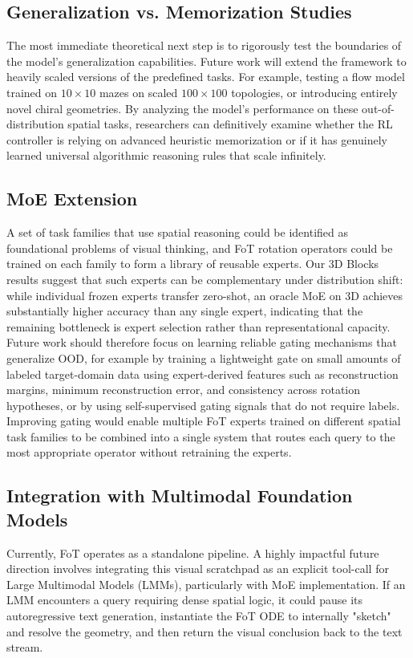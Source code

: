 \documentclass{l4proj}
\begin{document}
\subsection{Generalization vs. Memorization Studies}
The most immediate theoretical next step is to rigorously test the boundaries of the model's generalization capabilities. Future work will extend the framework to heavily scaled versions of the predefined tasks. For example, testing a flow model trained on $10 \times 10$ mazes on scaled $100 \times 100$ topologies, or introducing entirely novel chiral geometries. By analyzing the model's performance on these out-of-distribution spatial tasks, researchers can definitively examine whether the RL controller is relying on advanced heuristic memorization or if it has genuinely learned universal algorithmic reasoning rules that scale infinitely.

\subsection{MoE Extension}
A set of task families that use spatial reasoning could be identified as foundational problems of visual thinking, and FoT rotation operators could be trained on each family to form a library of reusable experts. Our 3D Blocks results suggest that such experts can be complementary under distribution shift: while individual frozen experts transfer zero-shot, an oracle MoE on 3D achieves substantially higher accuracy than any single expert, indicating that the remaining bottleneck is expert selection rather than representational capacity. Future work should therefore focus on learning reliable gating mechanisms that generalize OOD, for example by training a lightweight gate on small amounts of labeled target-domain data using expert-derived features such as reconstruction margins, minimum reconstruction error, and consistency across rotation hypotheses, or by using self-supervised gating signals that do not require labels. Improving gating would enable multiple FoT experts trained on different spatial task families to be combined into a single system that routes each query to the most appropriate operator without retraining the experts.

\subsection{Integration with Multimodal Foundation Models}
Currently, FoT operates as a standalone pipeline. A highly impactful future direction involves integrating this visual scratchpad as an explicit tool-call for Large Multimodal Models (LMMs), particularly with MoE implementation. If an LMM encounters a query requiring dense spatial logic, it could pause its autoregressive text generation, instantiate the FoT ODE to internally "sketch" and resolve the geometry, and then return the visual conclusion back to the text stream.
\end{document}
